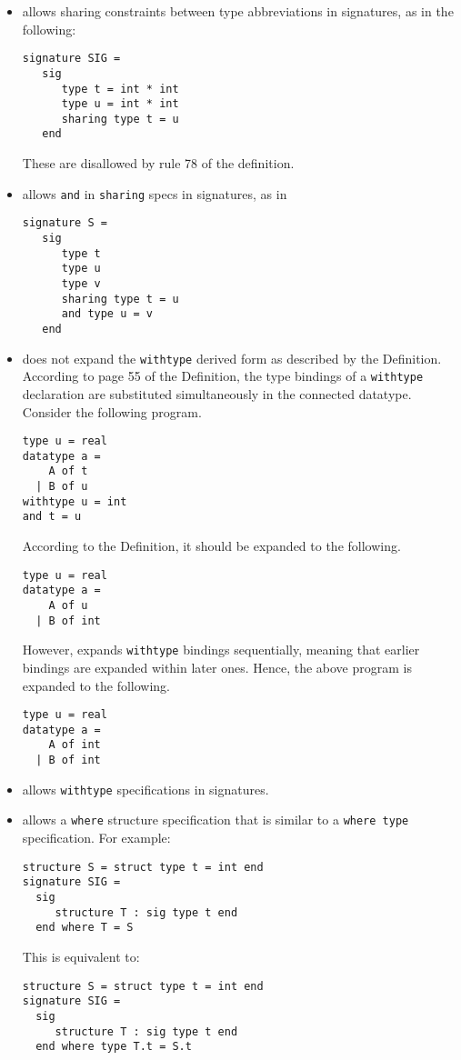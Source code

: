 \begin{itemize}
\item
{\smlnj} allows sharing constraints between type abbreviations in
signatures, as in the following:
\begin{verbatim}
signature SIG =
   sig
      type t = int * int
      type u = int * int
      sharing type t = u
   end
\end{verbatim}
These are disallowed by rule 78 of the definition.

\item
{\smlnj} allows {\tt and} in {\tt sharing} specs in signatures, as in
\begin{verbatim}
signature S =
   sig
      type t
      type u
      type v
      sharing type t = u
      and type u = v
   end
\end{verbatim}

\item
{\smlnj} does not expand the {\tt withtype} derived form as described by
the Definition.  According to page 55 of the Definition, the type
bindings of a {\tt withtype} declaration are substituted simultaneously
in the connected datatype.  Consider the following program.
\begin{verbatim}
type u = real
datatype a =
    A of t
  | B of u
withtype u = int
and t = u
\end{verbatim}
According to the Definition, it should be expanded to the following.
\begin{verbatim}
type u = real
datatype a =
    A of u
  | B of int
\end{verbatim}
However, {\smlnj} expands {\tt withtype} bindings sequentially, meaning
that earlier bindings are expanded within later ones.  Hence, the
above program is expanded to the following.
\begin{verbatim}
type u = real
datatype a =
    A of int
  | B of int
\end{verbatim}

\item
{\smlnj} allows {\tt withtype} specifications in signatures.

\item
{\smlnj} allows a {\tt where} structure specification that is similar
to a {\tt where type} specification.  For example:
\begin{verbatim}
structure S = struct type t = int end
signature SIG =
  sig
     structure T : sig type t end
  end where T = S
\end{verbatim}
This is equivalent to:
\begin{verbatim}
structure S = struct type t = int end
signature SIG =
  sig
     structure T : sig type t end
  end where type T.t = S.t
\end{verbatim}

\end{itemize}

